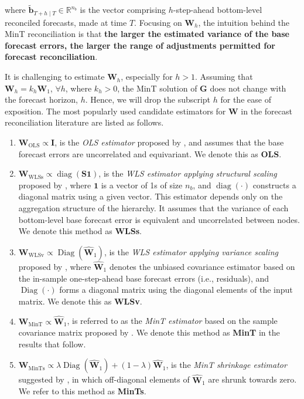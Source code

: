\documentclass[11pt,a4paper,]{article}
\providecommand{\tightlist}{%
  \setlength{\itemsep}{0pt}\setlength{\parskip}{0pt}}
\begin{document}
where \(\tilde{\boldsymbol{b}}_{T+h \mid T} \in \mathbb{R}^{n_b}\) is
the vector comprising \(h\)-step-ahead bottom-level reconciled
forecasts, made at time \(T\). Focusing on \(\boldsymbol{W}_h\), the
intuition behind the MinT reconciliation is that \textbf{the larger the
estimated variance of the base forecast errors, the larger the range of
adjustments permitted for forecast reconciliation}.

It is challenging to estimate \(\boldsymbol{W}_h\), especially for
\(h > 1\). Assuming that \(\boldsymbol{W}_h = k_h\boldsymbol{W}_1\),
\(\forall h\), where \(k_h > 0\), the MinT solution of
\(\boldsymbol{G}\) does not change with the forecast horizon, \(h\).
Hence, we will drop the subscript \(h\) for the ease of exposition. The
most popularly used candidate estimators for \(\boldsymbol{W}\) in the
forecast reconciliation literature are listed as follows.

\begin{enumerate}
\def\labelenumi{\arabic{enumi}.}
\tightlist
\item
  \(\boldsymbol{W}_{\text{OLS}} \propto \boldsymbol{I}\), is the
  \emph{OLS estimator} proposed by \textcite{Hyndman2011-sd}, and
  assumes that the base forecast errors are uncorrelated and
  equivariant. We denote this as \textbf{OLS}.
\item
  \(\boldsymbol{W}_{\text{WLSs}} \propto \operatorname{diag}(\boldsymbol{S} \mathbf{1})\),
  is the \emph{WLS estimator applying structural scaling} proposed by
  \textcite{Athanasopoulos2017-jj}, where \(\mathbf{1}\) is a vector of
  1s of size \(n_b\), and \(\operatorname{diag}(\cdot)\) constructs a
  diagonal matrix using a given vector. This estimator depends only on
  the aggregation structure of the hierarchy. It assumes that the
  variance of each bottom-level base forecast error is equivalent and
  uncorrelated between nodes. We denote this method as \textbf{WLSs}.
\item
  \(\boldsymbol{W}_{\text{WLSv}} \propto \operatorname{Diag}(\hat{\boldsymbol{W}}_1)\),
  is the \emph{WLS estimator applying variance scaling} proposed by
  \textcite{Hyndman2016-cz}, where \(\hat{\boldsymbol{W}}_1\) denotes
  the unbiased covariance estimator based on the in-sample
  one-step-ahead base forecast errors (i.e., residuals), and
  \(\operatorname{Diag}(\cdot)\) forms a diagonal matrix using the
  diagonal elements of the input matrix. We denote this as
  \textbf{WLSv}.
\item
  \(\boldsymbol{W}_{\text{MinT}} \propto \hat{\boldsymbol{W}}_1\), is
  referred to as the \emph{MinT estimator} based on the sample
  covariance matrix proposed by \textcite{Wickramasuriya2019-fc}. We
  denote this method as \textbf{MinT} in the results that follow.
\item
  \(\boldsymbol{W}_{\text{MinTs}} \propto \lambda\operatorname{Diag}(\hat{\boldsymbol{W}}_1) + (1-\lambda)\hat{\boldsymbol{W}}_1\),
  is the \emph{MinT shrinkage estimator} suggested by
  \textcite{Wickramasuriya2019-fc}, in which off-diagonal elements of
  \(\hat{\boldsymbol{W}}_1\) are shrunk towards zero. We refer to this
  method as \textbf{MinTs}.
\end{enumerate}
\end{document}
